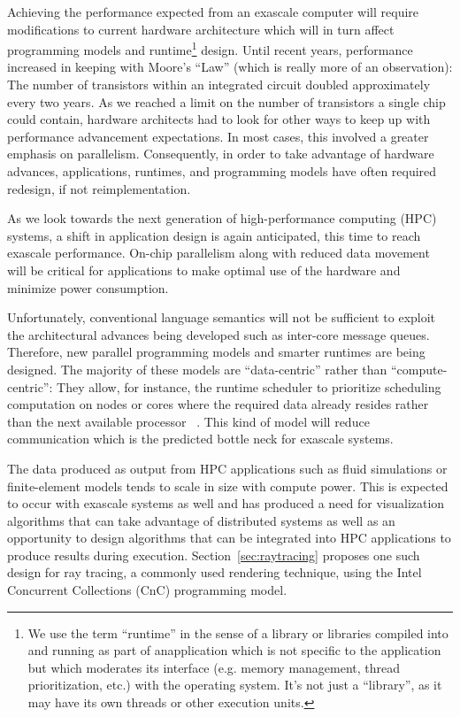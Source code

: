 
Achieving the performance expected from an exascale computer will
require modifications to current hardware architecture which will in
turn affect programming models and runtime\footnote{ %
  We use the term ``runtime'' in the sense of a library or libraries
  compiled into and running as part of anapplication which is not
  specific to the application but which moderates its interface (e.g.
  memory management, thread prioritization, etc.) with the operating
  system. It's not just a ``library'', as it may have its own threads
  or other execution units. %
} design. Until recent years, performance increased in keeping with
Moore's ``Law'' (which is really more of an observation): The number
of transistors within an integrated circuit doubled approximately
every two years. As we reached a limit on the number of transistors a
single chip could contain, hardware architects had to look for other
ways to keep up with performance advancement expectations. In most
cases, this involved a greater emphasis on parallelism. Consequently,
in order to take advantage of hardware advances, applications,
runtimes, and programming models have often required redesign, if not
reimplementation.

As we look towards the next generation of high-performance computing
(HPC) systems, a shift in application design is again anticipated,
this time to reach exascale performance. On-chip parallelism along
with reduced data movement will be critical for applications to make
optimal use of the hardware and minimize power consumption.

Unfortunately, conventional language semantics will not be sufficient
to exploit the architectural advances being developed such as
inter-core message queues. Therefore, new parallel programming models
and smarter runtimes are being designed. The majority of these models
are ``data-centric'' rather than ``compute-centric'': They allow, for
instance, the runtime scheduler to prioritize scheduling computation
on nodes or cores where the required data already resides rather than
the next available processor ~\cite{kogge2013exascale}. This kind of
model will reduce communication which is the predicted bottle neck for
exascale systems.

The data produced as output from HPC applications such as fluid
simulations or finite-element models tends to scale in size with
compute power. This is expected to occur with exascale systems as well
and has produced a need for visualization algorithms that can take
advantage of distributed systems as well as an opportunity to design
algorithms that can be integrated into HPC applications to produce
results during execution. Section~\ref{sec:raytracing} proposes one
such design for ray tracing, a commonly used rendering technique,
using the Intel Concurrent Collections (CnC) programming model.

